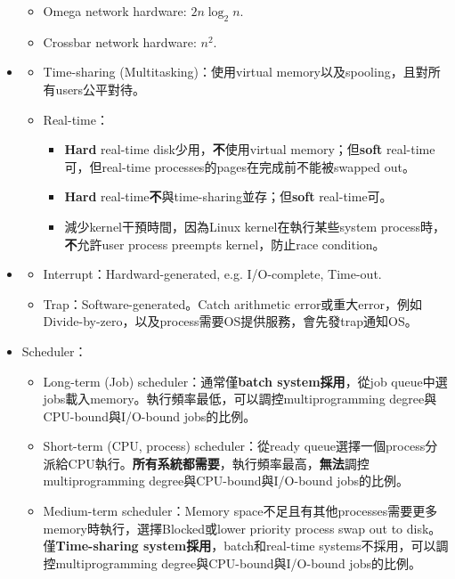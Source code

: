 \begin{itemize}
\begin{itemize}
\begin{itemize}
        \end{itemize}
        \item Omega network hardware: $2n\log_2 n$.
        \item Crossbar network hardware: $n^2$.
    \end{itemize}
    \item \quad\quad \begin{itemize}
        \item Time-sharing (Multitasking)：使用virtual memory以及spooling，且對所有users公平對待。
        \item Real-time：\begin{itemize}
            \item \textbf{Hard} real-time disk少用，\textbf{不}使用virtual memory；但\textbf{soft} real-time可，但real-time processes的pages在完成前不能被swapped out。
            \item \textbf{Hard} real-time\textbf{不}與time-sharing並存；但\textbf{soft} real-time可。
            \item 減少kernel干預時間，因為Linux kernel在執行某些system process時，\textbf{不}允許user process preempts kernel，防止race condition。
        \end{itemize}
    \end{itemize}
    \item \quad\quad \begin{itemize}
        \item Interrupt：Hardward-generated, e.g. I/O-complete, Time-out.
        \item Trap：Software-generated。Catch arithmetic error或重大error，例如Divide-by-zero，以及process需要OS提供服務，會先發trap通知OS。
    \end{itemize}
    \item Scheduler：\begin{itemize}
        \item Long-term (Job) scheduler：通常僅\textbf{batch system採用}，從job queue中選jobs載入memory。執行頻率最低，可以調控multiprogramming degree與CPU-bound與I/O-bound jobs的比例。
        \item Short-term (CPU, process) scheduler：從ready queue選擇一個process分派給CPU執行。\textbf{所有系統都需要}，執行頻率最高，\textbf{無法}調控multiprogramming degree與CPU-bound與I/O-bound jobs的比例。
        \item Medium-term scheduler：Memory space不足且有其他processes需要更多memory時執行，選擇Blocked或lower priority process swap out to disk。僅\textbf{Time-sharing system採用}，batch和real-time systems不採用，可以調控multiprogramming degree與CPU-bound與I/O-bound jobs的比例。

\end{itemize}
\end{itemize}
